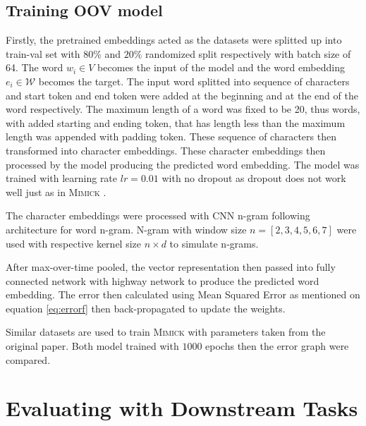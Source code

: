     \subsection{Training OOV model}
        Firstly, the pretrained embeddings acted as the datasets were
        splitted up into train-val set with $80\%$ and $20\%$
        randomized split respectively with batch size of 64. The word
        $w_i \in V$ becomes the input of the model and the word
        embedding $e_i \in \mathcal{W}$ becomes the target. The input
        word splitted into sequence of characters and start token and
        end token were added at the beginning and at the end of the
        word respectively. The maximum length of a word was fixed to
        be 20, thus words, with added starting and ending token, that
        has length less than the maximum length was appended with
        padding token. These sequence of characters then transformed
        into character embeddings. These character embeddings then
        processed by the model producing the predicted word embedding.
        The model was trained with learning rate $lr = 0.01$ with no
        dropout as dropout does not work well just as in
        \textsc{Mimick} \citep{mimicking2017Pinter}. 

        The character embeddings were processed with CNN n-gram
        following \citep{convolutional2014kim} architecture for word
        n-gram. N-gram with window size $n = [2, 3, 4, 5, 6, 7]$ were
        used with respective kernel size $n \times d$ to simulate
        n-grams.

        After max-over-time pooled, the vector representation then
        passed into fully connected network with highway network to
        produce the predicted word embedding. The error then
        calculated using Mean Squared Error as mentioned on equation
        \ref{eq:errorf} then back-propagated to update the weights.

        Similar datasets are used to train \textsc{Mimick}
        \citep{mimicking2017Pinter} with parameters taken from the
        original paper. Both model trained with $1000$ epochs then the
        error graph were compared.
    
\section{Evaluating with Downstream Tasks}
